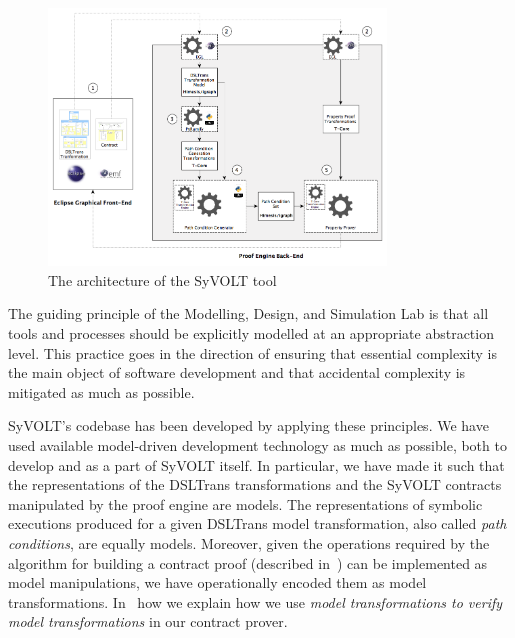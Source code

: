 \begin{figure}
\centering
\includegraphics[width=0.8\textwidth]{figures/syvolt_arch}
\caption{The architecture of the SyVOLT tool}
\label{fig:arch}
\end{figure}

The guiding principle of the Modelling, Design, and Simulation Lab is that all
tools and processes should be explicitly modelled at an appropriate abstraction level.
This practice goes in the direction of ensuring that essential
complexity is the main object of software development and that accidental
complexity is mitigated as much as possible.

SyVOLT's codebase has been developed by applying these principles. We have used
available model-driven development technology as much as possible, both to
develop and as a part of SyVOLT itself. In particular, we have made it such
that the representations of the DSLTrans transformations and the SyVOLT
contracts manipulated by the proof engine are models. The representations of symbolic
executions produced for a given DSLTrans model transformation, also called
\emph{path conditions}, are equally models. Moreover, given the operations
required by the algorithm for building a contract proof (described in~\cite{Lucio2014}) can be implemented as model
manipulations, we have operationally encoded them as model transformations.
In~\cite{LucioVang} how we explain how we use \emph{model transformations to
verify model transformations} in our contract prover.\\

